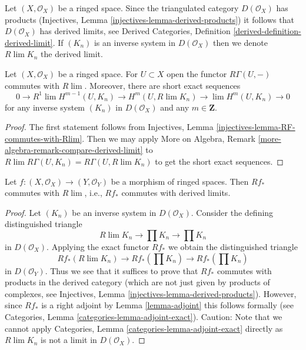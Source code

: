 \noindent
Let $(X, \mathcal{O}_X)$ be a ringed space. Since the triangulated category
$D(\mathcal{O}_X)$ has products
(Injectives, Lemma \ref{injectives-lemma-derived-products})
it follows that $D(\mathcal{O}_X)$ has derived limits, see
Derived Categories, Definition \ref{derived-definition-derived-limit}.
If $(K_n)$ is an inverse system in $D(\mathcal{O}_X)$ then we
denote $R\lim K_n$ the derived limit.

\begin{lemma}
\label{lemma-RGamma-commutes-with-Rlim}
Let $(X, \mathcal{O}_X)$ be a ringed space. For $U \subset X$ open the
functor $R\Gamma(U, -)$ commutes with $R\lim$. Moreover, there are
short exact sequences
$$
0 \to
R^1\lim H^{m - 1}(U, K_n) \to H^m(U, R\lim K_n) \to
\lim H^m(U, K_n) \to 0
$$
for any inverse system $(K_n)$ in $D(\mathcal{O}_X)$ and any $m \in \mathbf{Z}$.
\end{lemma}

\begin{proof}
The first statement follows from
Injectives, Lemma \ref{injectives-lemma-RF-commutes-with-Rlim}.
Then we may apply
More on Algebra, Remark \ref{more-algebra-remark-compare-derived-limit}
to $R\lim R\Gamma(U, K_n) = R\Gamma(U, R\lim K_n)$ to get the short
exact sequences.
\end{proof}

\begin{lemma}
\label{lemma-Rf-commutes-with-Rlim}
Let $f : (X, \mathcal{O}_X) \to (Y, \mathcal{O}_Y)$ be a morphism of ringed
spaces. Then $Rf_*$ commutes with $R\lim$, i.e., $Rf_*$ commutes with
derived limits.
\end{lemma}

\begin{proof}
Let $(K_n)$ be an inverse system in $D(\mathcal{O}_X)$. Consider the defining
distinguished triangle
$$
R\lim K_n \to \prod K_n \to \prod K_n
$$
in $D(\mathcal{O}_X)$. Applying the exact functor $Rf_*$ we obtain
the distinguished triangle
$$
Rf_*(R\lim K_n) \to Rf_*\left(\prod K_n\right) \to Rf_*\left(\prod K_n\right)
$$
in $D(\mathcal{O}_Y)$. Thus we see that it suffices to prove that
$Rf_*$ commutes with products in the derived category (which are not just
given by products of complexes, see
Injectives, Lemma \ref{injectives-lemma-derived-products}).
However, since $Rf_*$ is a right adjoint by Lemma \ref{lemma-adjoint}
this follows formally (see
Categories, Lemma \ref{categories-lemma-adjoint-exact}).
Caution: Note that we cannot apply
Categories, Lemma \ref{categories-lemma-adjoint-exact}
directly as $R\lim K_n$ is not a limit in $D(\mathcal{O}_X)$.
\end{proof}

